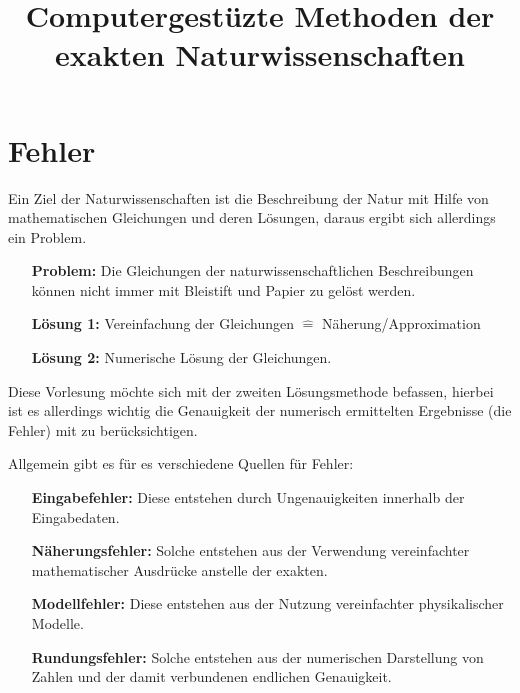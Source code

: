 \documentclass{scrartcl}
\begin{document}
\title{Computergestüzte Methoden der exakten Naturwissenschaften}           
\maketitle
\tableofcontents
\newpage

\section{Fehler}
Ein Ziel der Naturwissenschaften ist die Beschreibung der Natur mit Hilfe von mathematischen Gleichungen und deren Lösungen, daraus ergibt sich allerdings ein Problem.
\begin{itemize}
\item[\textbf{Problem:}] Die Gleichungen der naturwissenschaftlichen  Beschreibungen können nicht immer mit Bleistift und Papier zu gelöst werden.
\item[\textbf{Lösung 1:}] Vereinfachung der Gleichungen $\hat{=}$ Näherung/Approximation
\item[\textbf{Lösung 2:}] Numerische Lösung der Gleichungen.
\end{itemize}
Diese Vorlesung möchte sich mit der zweiten Lösungsmethode befassen, hierbei ist es allerdings wichtig die Genauigkeit der numerisch ermittelten Ergebnisse (die Fehler) mit zu berücksichtigen.

  Allgemein gibt es für es verschiedene Quellen für Fehler:
\begin{itemize}
 \item[\textbf{Eingabefehler:}] Diese entstehen durch Ungenauigkeiten innerhalb der Eingabedaten.
  \item[\textbf{Näherungsfehler:}] Solche entstehen aus der Verwendung vereinfachter mathematischer Ausdrücke anstelle der exakten.
  \item[\textbf{Modellfehler:}] Diese entstehen aus der Nutzung vereinfachter physikalischer Modelle.
  \item[\textbf{Rundungsfehler:}] Solche entstehen aus der numerischen Darstellung von Zahlen und der damit verbundenen endlichen Genauigkeit.
\end{itemize}
\end{document}
